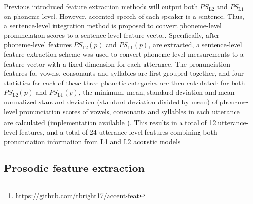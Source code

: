 Previous introduced feature extraction methods will output both $PS_{\mathrm{L2}}$ and $PS_{\mathrm{L1}}$ on phoneme level. However, accented speech of each speaker is a sentence. Thus, a sentence-level integration method is proposed to convert phoneme-level pronunciation scores to a sentence-level feature vector. Specifically, after phoneme-level features $PS_{\mathrm{L2}}(p)$ and $PS_{\mathrm{L1}}(p)$, are extracted, a sentence-level feature extraction scheme was used to convert phoneme-level measurements to a feature vector with a fixed dimension for each utterance. The pronunciation features for vowels, consonants and syllables are first grouped together, and four statistics for each of these three phonetic categories are then calculated: for both $PS_{\mathrm{L2}}(p)$ and $PS_{\mathrm{L1}}(p)$, the minimum, mean, standard deviation and mean-normalized standard deviation (standard deviation divided by mean) of phoneme-level pronunciation scores of vowels, consonants and syllables in each utterance are calculated (implementation available\footnote{https://github.com/tbright17/accent-feat}). This results in a total of 12 utterance-level features, and a total of 24 utterance-level features combining both pronunciation information from L1 and L2 acoustic models.

\subsection{Prosodic feature extraction}
\label{sec:supraseg}

